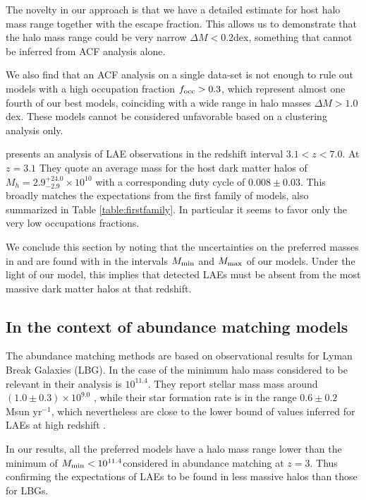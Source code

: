 \documentclass[usenatbib]{mn2e}
\newcommand{\hMsun}{{\ifmmode{h^{-1}{\rm
        {M_{\odot}}}}\else{$h^{-1}{\rm{M_{\odot}}}$}\fi}}
\begin{document}
The novelty in our approach is that we have a detailed estimate for 
host halo mass range together with the escape fraction. This allows us
to demonstrate that the halo mass range could be very narrow $\Delta M <
0.2$dex, something that cannot be inferred from ACF analysis alone. 

We also find that an ACF analysis on a single data-set is not enough to rule
out models with a high occupation fraction $f_{\rm occ}>0.3$, which
represent almost one fourth of our best models, coinciding with a wide
range in halo masses $\Delta M>1.0$ dex. These models cannot be
considered unfavorable based on a clustering analysis only.

\cite{Ouchi2010} presents an analysis of LAE observations in the
redshift interval $3.1<z<7.0$. At $z=3.1$ They quote an average
mass for the host dark matter halos of $M_{h}=2.9^{+24.0}_{-2.9}\times
10^{10}$ \hMsun with a corresponding duty cycle of $0.008\pm
0.03$.  This broadly matches the expectations from the first family of
models, also summarized in Table \ref{table:firstfamily}. In
particular it seems to favor only the very low occupations
fractions. 

We conclude this section by noting that the uncertainties on
the preferred masses in \citep{Gawiser07} and \cite{Ouchi2010} are
found with in the intervals $M_{\rm min}$ and $M_{\rm max}$ of our
models. Under the light of our model, this implies that detected LAEs
must be absent from the most massive dark matter halos at that
redshift.



\subsection{In the context of abundance matching models}


The abundance matching methods are based on observational results for Lyman Break Galaxies
\citep{Behroozi2013a,Behroozi2013b}  (LBG).  In the case of
\cite{Behroozi2013a} the minimum halo mass considered to be relevant
in their analysis is $10^{11.4}$\hMsun. They report  stellar mass mass
around $(1.0\pm0.3)\times 10^{9.0}$ \hMsun, while their star formation
rate is in the range $0.6\pm 0.2$ Msun yr$^{-1}$, which nevertheless
are close to the lower bound of values inferred for LAEs at high
redshift \citep{Gawiser2007,Nilsson2009,Pentericci2009}.

In our results, all the preferred models have a halo mass range lower
than the minimum of $M_{\rm min}<10^{11.4}$\hMsun considered in
abundance matching at $z=3$. Thus confirming the expectations of LAEs
to be found in less massive halos than those for LBGs.
\end{document}
